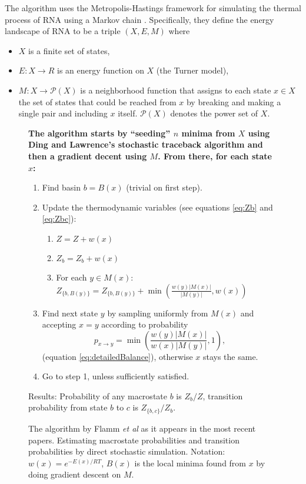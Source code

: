 The algorithm uses the Metropolis-Hastings framework for simulating
the thermal process of RNA using a Markov chain
\cite{metropolis1953equation} \cite{hastings1970monte}. Specifically, they define the energy
landscape of RNA to be a triple $(X, E, M)$ where
\begin{itemize}
\item $X$ is a finite set of states,
\item $E: X \to R$ is an energy function on $X$ (the Turner model),
\item $M: X \to \mathcal{P}(X)$ is a neighborhood function that
  assigns to each state $x \in X$ the set of states that could be
  reached from $x$ by breaking and making a single pair and including
  $x$ itself. $\mathcal{P}(X)$ denotes the power set of $X$.
\end{itemize}
\begin{figure}[t]
\bf The algorithm starts by ``seeding'' $n$ minima from $X$ using Ding
and Lawrence's stochastic traceback algorithm and then a gradient
decent using $M$. From there, for each state $x$:
\begin{enumerate}
\item Find basin $b = B(x)$ (trivial on first step).
\item Update the thermodynamic variables (see equations \ref{eq:Zb}
  and \ref{eq:Zbc}):
\begin{enumerate}
\item $Z = Z + w(x)$
\item $Z_b = Z_b  + w(x)$
\item For each $y \in M(x)$: $Z_{\{b, B(y)\}} = Z_{\{b, B(y)\}} +  \min \left (\frac{ w(y)  | M(x) |}{| M(y) |} , w(x) \right )$
\end{enumerate}
\item Find next state $y$ by sampling uniformly from $M(x)$ and
  accepting $x=y$ according to probability 
  $$p_{x\to y} = \min \left (\frac{w(y)|M(x)|}{w(x)|M(y)|},1\right
  ),$$ (equation \ref{eq:detailedBalance}), otherwise $x$ stays the
  same.
\item Go to step 1, unless sufficiently satisfied.
\end{enumerate}
Results: Probability of any macrostate $b$ is $Z_b/Z$, transition
probability from state $b$ to $c$ is $Z_{\{b, c\}}/Z_b$.
\caption[Barriers Psuedocode]{The algorithm by Flamm \emph{et al} as
  it appears in the most recent papers. Estimating macrostate
  probabilities and transition probabilities by direct stochastic
  simulation. Notation: $w(x)=e^{-E(x)/RT}$, $B(x)$ is the local
  minima found from $x$ by doing gradient descent on $M$.}
\label{fig:barriersAlgorithm}
\end{figure}
